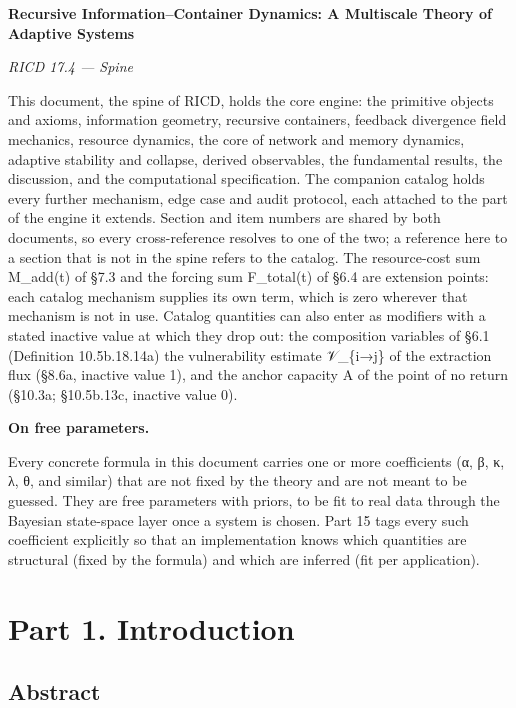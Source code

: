 \documentclass[
]{article}
\author{}
\date{}
\begin{document}
\textbf{Recursive Information--Container Dynamics: A Multiscale Theory
of Adaptive Systems}

\emph{RICD 17.4 --- Spine}

This document, the spine of RICD, holds the core engine: the primitive
objects and axioms, information geometry, recursive containers, feedback
divergence field mechanics, resource dynamics, the core of network and
memory dynamics, adaptive stability and collapse, derived observables,
the fundamental results, the discussion, and the computational
specification. The companion catalog holds every further mechanism, edge
case and audit protocol, each attached to the part of the engine it
extends. Section and item numbers are shared by both documents, so every
cross-reference resolves to one of the two; a reference here to a
section that is not in the spine refers to the catalog. The
resource-cost sum M\_add(t) of §7.3 and the forcing sum F\_total(t) of
§6.4 are extension points: each catalog mechanism supplies its own term,
which is zero wherever that mechanism is not in use. Catalog quantities
can also enter as modifiers with a stated inactive value at which they
drop out: the composition variables of §6.1 (Definition 10.5b.18.14a)
the vulnerability estimate 𝒱\_\{i→j\} of the extraction flux (§8.6a,
inactive value 1), and the anchor capacity A of the point of no return
(§10.3a; §10.5b.13c, inactive value 0).

\textbf{On free parameters.}

Every concrete formula in this document carries one or more coefficients
(α, β, κ, λ, θ, and similar) that are not fixed by the theory and are
not meant to be guessed. They are free parameters with priors, to be fit
to real data through the Bayesian state-space layer once a system is
chosen. Part 15 tags every such coefficient explicitly so that an
implementation knows which quantities are structural (fixed by the
formula) and which are inferred (fit per application).

\hypertarget{part-1.-introduction}{%
\section{Part 1. Introduction}\label{part-1.-introduction}}

\hypertarget{abstract}{%
\subsection{Abstract}\label{abstract}}
\end{document}
